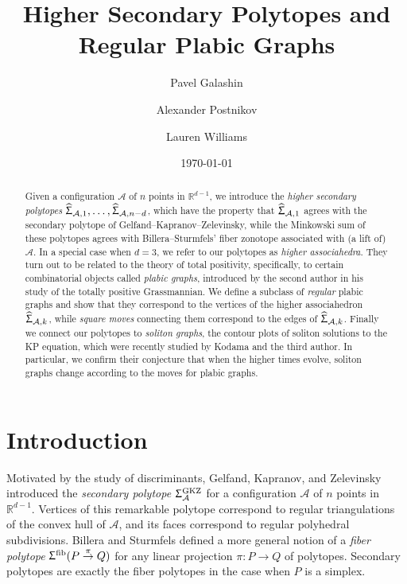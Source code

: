 \documentclass[11pt]{amsart}
\title{Higher Secondary Polytopes and Regular Plabic Graphs}
\author{Pavel Galashin}
\author{Alexander Postnikov}
\author{Lauren Williams}
\date{\today}
\theoremstyle{plain}
\theoremstyle{definition}
\def\R{\mathbb{R}}
\def\A{\mathcal{A}}
\def\GKZ{{\operatorname{GKZ}}}
\def\HSP{\widehat\Upsigma}
\def\Sigma{\HSP}
\def\fiber{{\operatorname{fib}}}
\def\FibPoly{\Upsigma^\fiber}
\def\SigmaGKZ{\Upsigma_\A^{\GKZ}}
\def\pito{\overset \pi \to}
\begin{document}
\begin{abstract}
Given a configuration $\A$ of $n$ points in $\R^{d-1}$, we introduce the \emph{higher secondary polytopes} $\Sigma_{\A,1},\dots, \Sigma_{\A,n-d}$, which have the property that 
	$\Sigma_{\A,1}$ agrees with  the secondary polytope of Gelfand--Kapranov--Zelevinsky, while the Minkowski sum of these polytopes agrees with Billera--Sturmfels' fiber zonotope associated with (a lift of) $\A$. 
	In a special case when $d=3$, we refer to our polytopes as \emph{higher associahedra}. They turn out to be related to the theory of total positivity, specifically, to certain combinatorial objects called \emph{plabic graphs}, introduced by the second author in his study of the totally positive Grassmannian.  We define a subclass of \emph{regular} plabic graphs and show that they correspond to the vertices of the higher associahedron $\Sigma_{\A,k}$, while \emph{square moves} connecting them correspond to the edges of $\Sigma_{\A,k}$. Finally we connect our polytopes to \emph{soliton graphs}, the contour plots of soliton solutions to the KP equation, which were recently studied by Kodama and the third author.  In particular, we confirm their conjecture that when the higher times evolve, soliton graphs change according to the moves for plabic graphs. 
\end{abstract}

\maketitle
\setcounter{tocdepth}{1}
\tableofcontents

\def\Gr{\operatorname{Gr}}
\def\Grtp{\Gr_{>0}}
\def\ngon{\text{$n$-gon}}


\def\pslope{0.6}
\def\parallelogramNew{
\begin{tikzpicture}[yscale=0.25,xscale=0.2]
\draw[line width=0.5pt] (0,0)--(\pslope,1)--(1+\pslope,1)--(1,0)--cycle;
\end{tikzpicture}\!
}

\section{Introduction}
\label{sec:intro}

Motivated by the study of discriminants, Gelfand, Kapranov, and Zelevinsky
\cite{GKZ} introduced the \emph{secondary polytope} $\SigmaGKZ$
for a configuration $\A$ of $n$ points in $\R^{d-1}$.  Vertices of this
remarkable polytope correspond to  regular triangulations of the convex
hull of $\A$, and its faces correspond to  regular polyhedral
subdivisions.  Billera and Sturmfels \cite{BS} defined a more general
notion of a \emph{fiber polytope} $\FibPoly(P\pito Q)$ 
for any linear projection $\pi:P\to Q$ of polytopes.
Secondary polytopes are exactly the fiber polytopes in the case when $P$ is a
simplex.
\end{document}
